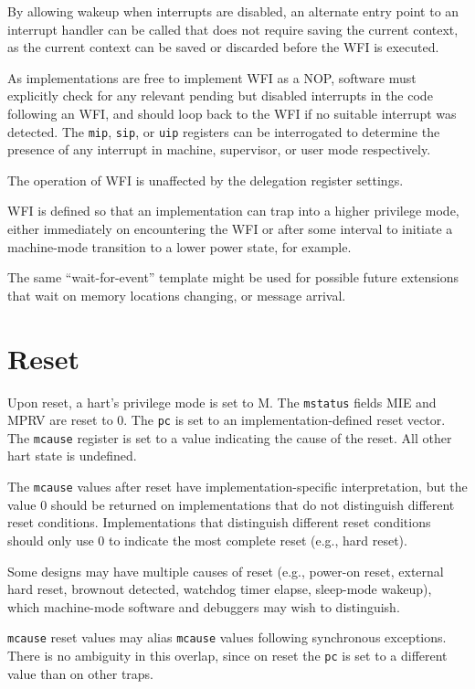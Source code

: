 \begin{commentary}
By allowing wakeup when interrupts are disabled, an alternate entry
point to an interrupt handler can be called that does not require
saving the current context, as the current context can be saved or
discarded before the WFI is executed.

As implementations are free to implement WFI as a NOP, software must
explicitly check for any relevant pending but disabled interrupts in
the code following an WFI, and should loop back to the WFI if no
suitable interrupt was detected.  The {\tt mip}, {\tt sip},
or {\tt uip} registers can be interrogated to determine the presence
of any interrupt in machine, supervisor, or user mode
respectively.

The operation of WFI is unaffected by the delegation register settings.

WFI is defined so that an implementation can trap into a higher
privilege mode, either immediately on encountering the WFI or after
some interval to initiate a machine-mode transition to a lower power
state, for example.
\end{commentary}

\begin{commentary}
The same ``wait-for-event'' template might be used for possible future
extensions that wait on memory locations changing, or message
arrival.
\end{commentary}

\section{Reset}
\label{sec:reset}

Upon reset, a hart's privilege mode is set to M.  The {\tt mstatus} fields MIE
and MPRV are reset to 0.  The {\tt pc} is
set to an implementation-defined reset vector.  The {\tt mcause} register is
set to a value indicating the cause of the reset.  All other hart state is
undefined.

The {\tt mcause} values after reset have implementation-specific
interpretation, but the value 0 should be returned on implementations
that do not distinguish different reset conditions. Implementations
that distinguish different reset conditions should only use 0 to
indicate the most complete reset (e.g., hard reset).

\begin{commentary}
Some designs may have multiple causes of reset (e.g., power-on reset,
external hard reset, brownout detected, watchdog timer elapse,
sleep-mode wakeup), which machine-mode software and debuggers may wish
to distinguish.

{\tt mcause} reset values may alias {\tt mcause} values following
synchronous exceptions.  There is no ambiguity in this overlap, since
on reset the {\tt pc} is set to a different value than on other traps.
\end{commentary}

